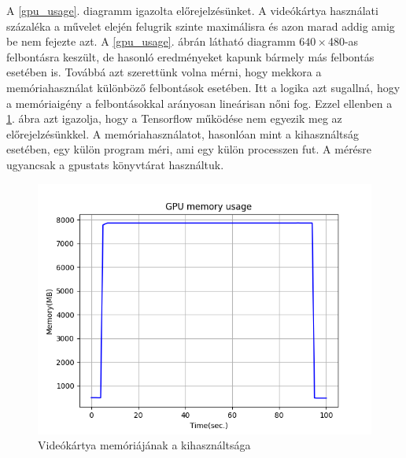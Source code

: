 \documentclass[12pt, a4paper, oneside]{book}
\theoremstyle{tetel}
\begin{document}
A \ref{gpu_usage}. diagramm igazolta előrejelzésünket. A videókártya használati százaléka a művelet elején felugrik szinte maximálisra és azon marad addig amig be nem fejezte azt. A \ref{gpu_usage}. ábrán látható diagramm $640 \times $480-as felbontásra keszült, de hasonló eredményeket kapunk bármely más felbontás esetében is.
\newline
\indent
Továbbá azt szerettünk volna mérni, hogy mekkora a memóriahasználat különböző felbontások esetében. Itt a logika azt sugallná, hogy a memóriaigény a felbontásokkal arányosan lineárisan nőni fog. Ezzel ellenben a \ref{gpu_memory_usage}. ábra azt igazolja, hogy a Tensorflow működése nem egyezik meg az előrejelzésünkkel. A memóriahasználatot, hasonlóan mint a kihasználtság esetében, egy külön program méri, ami egy külön processzen fut. A mérésre ugyancsak a gpustats könyvtárat használtuk.

\begin{figure}[!htbp]
	\begin{center}
		\includegraphics[scale=0.8]{gpu_memory_usage.png}
		\caption{Videókártya memóriájának a kihasználtsága}
		\label{gpu_memory_usage}
	\end{center}
\end{figure} 
\end{document}
